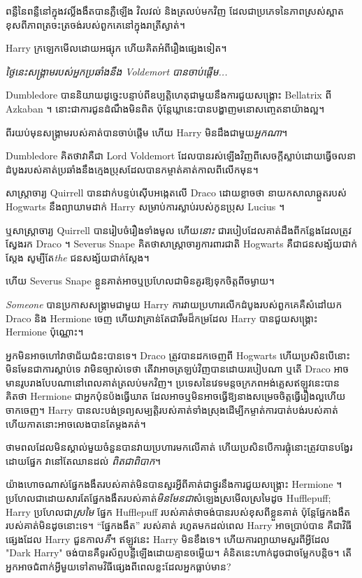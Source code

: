 ពន្លឺនៃពន្លឺនៅក្នុងវល្លិ៍ងងឹតបានភ្លឺឡើង វិលវល់ និងត្រលប់មកវិញ ដែលជាប្រភេទនៃភាពស្រស់ស្អាតខុសពីភាពត្រចះត្រចង់របស់ពួកគេនៅក្នុងរាត្រីស្ងាត់។

Harry ក្រឡេក​មើល​ដោយ​អផ្សុក ហើយ​គិត​អំពី​រឿង​ផ្សេង​ទៀត។

\emph{ថ្ងៃនេះសង្រ្គាមរបស់អ្នកប្រឆាំងនឹង Voldemort បានចាប់ផ្តើម...}

Dumbledore បាននិយាយដូច្នេះបន្ទាប់ពីឧប្បត្តិហេតុជាមួយនឹងការជួយសង្គ្រោះ Bellatrix ពី Azkaban ។ នោះ​ជា​ការ​ជូន​ដំណឹង​មិន​ពិត ប៉ុន្តែ​ឃ្លា​នេះ​បាន​បង្ហាញ​មនោសញ្ចេតនា​យ៉ាង​ល្អ។

ពីរយប់មុនសង្រ្គាមរបស់គាត់បានចាប់ផ្តើម ហើយ Harry មិនដឹងជាមួយ\emph{អ្នកណា}។

Dumbledore គិតថាវាគឺជា Lord Voldemort ដែលបានរស់ឡើងវិញពីសេចក្តីស្លាប់ដោយធ្វើចលនាដំបូងរបស់គាត់ប្រឆាំងនឹងក្មេងប្រុសដែលបានកម្ចាត់គាត់កាលពីលើកមុន។

សាស្ត្រាចារ្យ Quirrell បានដាក់បន្ទប់ស៊ើបអង្កេតលើ Draco ដោយខ្លាចថា នាយកសាលាឆ្កួតរបស់ Hogwarts នឹងព្យាយាមដាក់ Harry សម្រាប់ការស្លាប់របស់កូនប្រុស Lucius ។

ឬសាស្រ្តាចារ្យ Quirrell បានរៀបចំរឿងទាំងមូល ហើយ\emph{នោះ} ជារបៀបដែលគាត់ដឹងពីកន្លែងដែលត្រូវស្វែងរក Draco ។ Severus Snape គិតថាសាស្រ្តាចារ្យការពារជាតិ Hogwarts គឺជាជនសង្ស័យជាក់ស្តែង សូម្បីតែ\emph{the} ជនសង្ស័យជាក់ស្តែង។

ហើយ Severus Snape ខ្លួនគាត់អាចឬប្រហែលជាមិនគួរឱ្យទុកចិត្តពីចម្ងាយ។

\emph{Someone} បានប្រកាសសង្រ្គាមជាមួយ Harry ការវាយប្រហារលើកដំបូងរបស់ពួកគេគឺសំដៅយក Draco និង Hermione ចេញ ហើយវាគ្រាន់តែជារឹមដ៏កម្រដែល Harry បានជួយសង្គ្រោះ Hermione ប៉ុណ្ណោះ។

អ្នកមិនអាចហៅវាថាជ័យជំនះបានទេ។ Draco ត្រូវបានដកចេញពី Hogwarts ហើយប្រសិនបើនោះមិនមែនជាការស្លាប់ទេ វាមិនច្បាស់ទេថា តើវាអាចត្រឡប់វិញបានដោយរបៀបណា ឬតើ Draco អាចមានរូបរាងបែបណានៅពេលគាត់ត្រលប់មកវិញ។ ប្រទេសនៃវេទមន្តចក្រភពអង់គ្លេសឥឡូវនេះបានគិតថា Hermione ជាអ្នកប៉ុនប៉ងធ្វើឃាត ដែលអាចឬមិនអាចធ្វើឱ្យនាងសម្រេចចិត្តធ្វើរឿងល្អហើយចាកចេញ។ Harry បានលះបង់ទ្រព្យសម្បត្តិរបស់គាត់ទាំងស្រុងដើម្បីកម្ចាត់ការបាត់បង់របស់គាត់ ហើយកាតនោះអាចលេងបានតែម្តងគត់។

ថាមពលដែលមិនស្គាល់មួយចំនួនបានវាយប្រហារមកលើគាត់ ហើយប្រសិនបើការផ្លុំនោះត្រូវបានបង្វែរដោយផ្នែក វានៅតែឈានដល់ \emph{ពិតជាពិបាក}។

យ៉ាងហោចណាស់ផ្នែកងងឹតរបស់គាត់មិនបានសួរអ្វីពីគាត់ជាថ្នូរនឹងការជួយសង្គ្រោះ Hermione ។ ប្រហែលជាដោយសារតែផ្នែកងងឹតរបស់គាត់\emph{មិនមែនជា}សំឡេងស្រមើលស្រមៃដូច Hufflepuff; Harry ប្រហែលជា\emph{ស្រមៃ} ផ្នែក Hufflepuff របស់គាត់ថាចង់បានរបស់ខុសពីខ្លួនគាត់ ប៉ុន្តែផ្នែកងងឹតរបស់គាត់មិនដូចនោះទេ។ “ផ្នែកងងឹត” របស់គាត់ រហូតមកដល់ពេល Harry អាចប្រាប់បាន គឺជាវិធីផ្សេងដែល Harry ជួនកាល\emph{គឺ}។ ឥឡូវនេះ Harry មិនខឹងទេ។ ហើយការព្យាយាមសួរពីអ្វីដែល "Dark Harry" ចង់បានគឺទូរស័ព្ទបន្លឺឡើងដោយគ្មានចម្លើយ។ គំនិតនេះហាក់ដូចជាចម្លែកបន្តិច។ តើ​អ្នក​អាច​ជំពាក់​អ្វី​មួយ​ទៅ​តាម​វិធី​ផ្សេង​ពី​ពេល​ខ្លះ​ដែល​អ្នក​ធ្លាប់​មាន?

